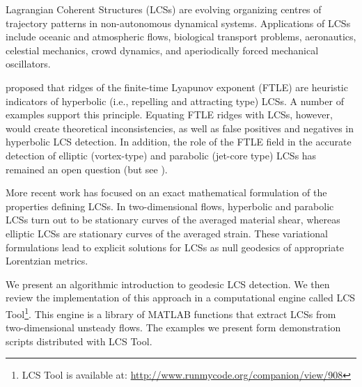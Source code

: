 \documentclass[5p]{elsarticle}
\begin{document}
\begin{sloppypar}
Lagrangian Coherent Structures (LCSs) are evolving organizing centres of trajectory patterns in non-autonomous dynamical systems\citep{haller00:_lagran,peacock13:_lagran,haller15:_langr_coher_struc}. Applications of LCSs include oceanic and atmospheric flows\citep{beron-vera13:_objec_agulh,koh02:_hyper}, biological transport problems\citep{wilson09:_lagran_reynol,tallapragada11:_lagran,huhn12:_south_indian_ocean_count_madag}, aeronautics\citep{tang10:_accur_lagran_hong_kong_inter_airpor}, celestial mechanics\citep{gawlik09:_lagran}, crowd dynamics\citep{ali07:_lagran_partic_dynam_approac_crowd}, and aperiodically forced mechanical oscillators\citep{hadjighasem13:_detec_kam}.
\end{sloppypar}

\citet{haller01:_distin} proposed that ridges of the finite-time Lyapunov exponent (FTLE) are heuristic indicators of hyperbolic (i.e., repelling and attracting type) LCSs.
A number of examples support this principle\citep{peacock13:_lagran}.
Equating FTLE ridges with LCSs, however, would create theoretical inconsistencies, as well as false positives and negatives in hyperbolic LCS detection\citep{haller11:_lagran_coher_struc,norgard12:_secon_lagran_coher_struc}.
In addition, the role of the FTLE field in the accurate detection of elliptic (vortex-type) and parabolic (jet-core type) LCSs has remained an open question (but see \citet{beron-vera10:_invar_lagran}).

More recent work has focused on an exact mathematical formulation of the properties defining LCSs\citep{haller11:_lagran_coher_struc,farazmand12:_comput_lagran,haller12:_geodes_theor_trans_barrier_two_dimen_flows,haller13:_coher_lagran,haller14:_adden_coher_lagran,farazmand13:_attrac_lagran,blazevski14:_hyper_ellip_trans_barrier_three}.
In two-dimensional flows, hyperbolic and parabolic LCSs turn out to be stationary curves of the averaged material shear\citep{farazmand14:_shearless}, whereas elliptic LCSs are stationary curves of the averaged strain\citep{haller13:_coher_lagran,haller14:_adden_coher_lagran}.
These variational formulations lead to explicit solutions for LCSs as null geodesics of appropriate Lorentzian metrics.

\begin{sloppypar}
We present an algorithmic introduction to geodesic LCS detection.
We then review the implementation of this approach in a computational engine called LCS Tool\footnote{LCS Tool is available at: \url{http://www.runmycode.org/companion/view/908}}.
This engine is a library of MATLAB functions that extract LCSs from two-dimensional unsteady flows. The examples we present form demonstration scripts distributed with LCS Tool.
\end{sloppypar}
\end{document}

